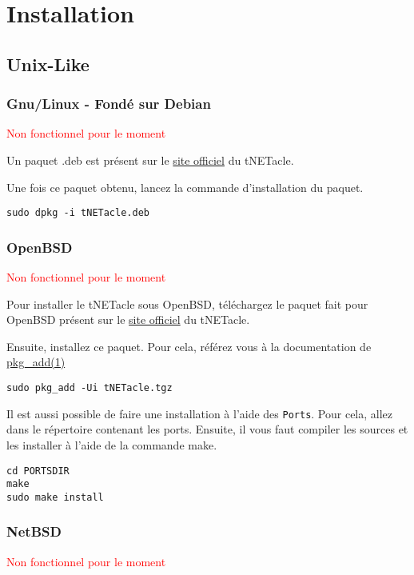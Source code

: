 \section{Installation}
\subsection{Unix-Like}
\subsubsection{Gnu/Linux - Fondé sur Debian}
\textcolor{red}{Non fonctionnel pour le moment}

Un paquet .deb est présent sur le \href{http://eip.epitech.eu/2013/tnetacle/tnetacle.html}{site officiel} du tNETacle.

Une fois ce paquet obtenu, lancez la commande d'installation du paquet.

\begin{lstlisting}
sudo dpkg -i tNETacle.deb
\end{lstlisting}

\subsubsection{OpenBSD}
\textcolor{red}{Non fonctionnel pour le moment}

Pour installer le tNETacle sous OpenBSD, téléchargez le
paquet fait pour OpenBSD présent sur le \href{http://eip.epitech.eu/2013/tnetacle/tnetacle.html}{site officiel} du tNETacle.

Ensuite, installez ce paquet. Pour cela, référez vous à la documentation de
\href{http://www.openbsd.org/faq/fr/faq15.html}{pkg\_add(1)}

\begin{lstlisting}
sudo pkg_add -Ui tNETacle.tgz
\end{lstlisting}


Il est aussi possible de faire une installation à l'aide des \texttt{Ports}.
Pour cela, allez dans le répertoire contenant les ports.
Ensuite, il vous faut compiler les sources et les installer à l'aide de la commande make.

\begin{lstlisting}
cd PORTSDIR
make
sudo make install
\end{lstlisting}

\subsubsection{NetBSD}
\textcolor{red}{Non fonctionnel pour le moment}


